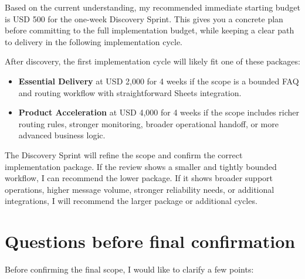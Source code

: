 \documentclass[11pt,a4paper]{article}
\begin{document}
Based on the current understanding, my recommended immediate starting budget is USD 500 for the one-week Discovery Sprint. This gives you a concrete plan before committing to the full implementation budget, while keeping a clear path to delivery in the following implementation cycle.\par

After discovery, the first implementation cycle will likely fit one of these packages:\par

\begin{itemize}
\item \textbf{Essential Delivery} at USD 2,000 for 4 weeks if the scope is a bounded FAQ and routing workflow with straightforward Sheets integration.
\item \textbf{Product Acceleration} at USD 4,000 for 4 weeks if the scope includes richer routing rules, stronger monitoring, broader operational handoff, or more advanced business logic.
\end{itemize}

The Discovery Sprint will refine the scope and confirm the correct implementation package. If the review shows a smaller and tightly bounded workflow, I can recommend the lower package. If it shows broader support operations, higher message volume, stronger reliability needs, or additional integrations, I will recommend the larger package or additional cycles.\par

\section*{Questions before final confirmation}

Before confirming the final scope, I would like to clarify a few points:\par
\end{document}
